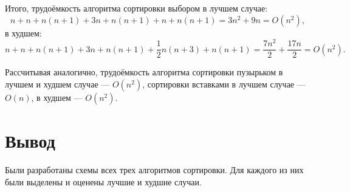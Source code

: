 Итого, трудоёмкость алгоритма сортировки выбором в лучшем случае:
\begin{equation}
	n+n+n(n+1)+3n+n(n+1)+n+n(n+1)=3n^2+9n=O(n^2),
\end{equation}
в худшем:
\begin{equation}
	n+n+n(n+1)+3n+n(n+1)+\frac12n(n+3)+n(n+1)=\frac{7n^2}{2}+\frac{17n}{2}=O(n^2).
\end{equation}

Рассчитывая аналогично, трудоёмкость алгоритма сортировки пузырьком в лучшем и худшем случае — $O(n^2)$, сортировки вставками в лучшем случае — $O(n)$, в худшем — $O(n^2)$.

\section*{Вывод}

Были разработаны схемы всех трех алгоритмов сортировки.
Для каждого из них были выделены и оценены лучшие и худшие случаи.
